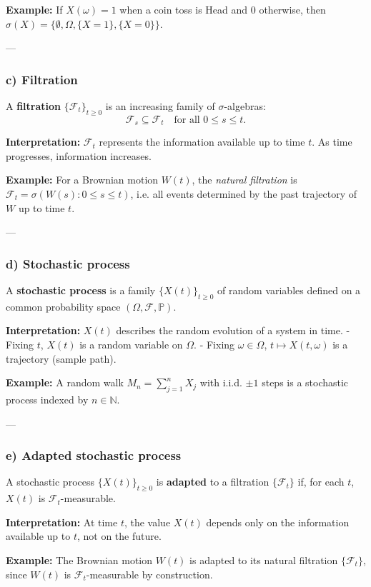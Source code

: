 \documentclass[12pt,a4paper]{book}
\theoremstyle{remark}
\newcommand{\PP}{\mathbb{P}}          %
\newcommand{\NN}{\mathbb{N}}
\newcommand{\F}{\mathcal{F}}          %
\begin{document}
\textbf{Example:} If $X(\omega)=1$ when a coin toss is Head and $0$ otherwise, then $\sigma(X)=\{\emptyset, \Omega, \{X=1\}, \{X=0\}\}$.

---

\subsubsection*{c) Filtration}
A \textbf{filtration} $\{\F_t\}_{t\ge0}$ is an increasing family of $\sigma$-algebras:
\[
\F_s \subseteq \F_t \quad \text{for all } 0 \leq s \leq t.
\]

\textbf{Interpretation:} $\F_t$ represents the information available up to time $t$. As time progresses, information increases.  

\textbf{Example:} For a Brownian motion $W(t)$, the \emph{natural filtration} is $\F_t=\sigma(W(s):0\leq s \leq t)$, i.e. all events determined by the past trajectory of $W$ up to time $t$.

---

\subsubsection*{d) Stochastic process}
A \textbf{stochastic process} is a family $\{X(t)\}_{t\ge0}$ of random variables defined on a common probability space $(\Omega, \F, \PP)$.  

\textbf{Interpretation:} $X(t)$ describes the random evolution of a system in time.  
- Fixing $t$, $X(t)$ is a random variable on $\Omega$.  
- Fixing $\omega \in \Omega$, $t \mapsto X(t,\omega)$ is a trajectory (sample path).

\textbf{Example:} A random walk $M_n=\sum_{j=1}^n X_j$ with i.i.d. $\pm1$ steps is a stochastic process indexed by $n\in\NN$.

---

\subsubsection*{e) Adapted stochastic process}
A stochastic process $\{X(t)\}_{t\ge0}$ is \textbf{adapted} to a filtration $\{\F_t\}$ if, for each $t$, $X(t)$ is $\F_t$-measurable.

\textbf{Interpretation:} At time $t$, the value $X(t)$ depends only on the information available up to $t$, not on the future.  

\textbf{Example:} The Brownian motion $W(t)$ is adapted to its natural filtration $\{\F_t\}$, since $W(t)$ is $\F_t$-measurable by construction.
\end{document}

